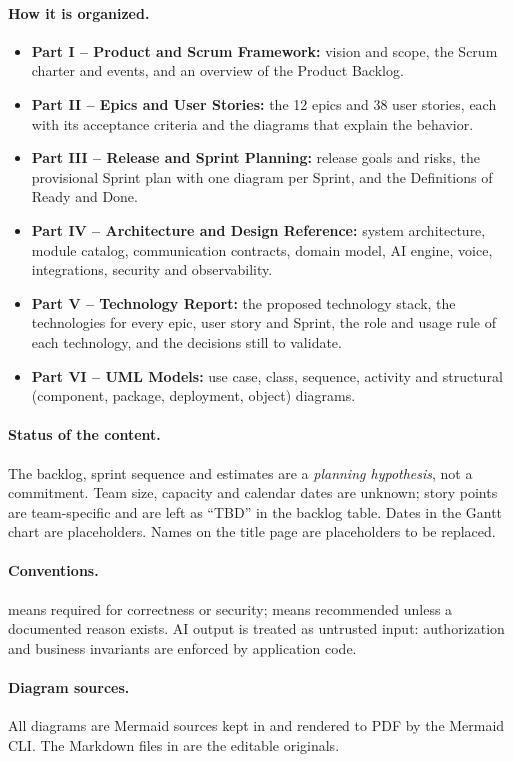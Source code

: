 \paragraph{How it is organized.}
\begin{itemize}
  \item \textbf{Part I -- Product and Scrum Framework:} vision and scope, the Scrum charter and events, and an overview of the Product Backlog.
  \item \textbf{Part II -- Epics and User Stories:} the 12 epics and 38 user stories, each with its acceptance criteria and the diagrams that explain the behavior.
  \item \textbf{Part III -- Release and Sprint Planning:} release goals and risks, the provisional Sprint plan with one diagram per Sprint, and the Definitions of Ready and Done.
  \item \textbf{Part IV -- Architecture and Design Reference:} system architecture, module catalog, communication contracts, domain model, AI engine, voice, integrations, security and observability.
  \item \textbf{Part V -- Technology Report:} the proposed technology stack, the technologies for every epic, user story and Sprint, the role and usage rule of each technology, and the decisions still to validate.
  \item \textbf{Part VI -- UML Models:} use case, class, sequence, activity and structural (component, package, deployment, object) diagrams.
\end{itemize}

\paragraph{Status of the content.}
The backlog, sprint sequence and estimates are a \emph{planning hypothesis}, not a commitment. Team size, capacity and calendar dates are unknown; story points are team-specific and are left as ``TBD'' in the backlog table. Dates in the Gantt chart are placeholders. Names on the title page are placeholders to be replaced.

\paragraph{Conventions.}
 means required for correctness or security;  means recommended unless a documented reason exists. AI output is treated as untrusted input: authorization and business invariants are enforced by application code.

\paragraph{Diagram sources.}
All diagrams are Mermaid sources kept in  and rendered to PDF by the Mermaid CLI. The Markdown files in  are the editable originals.
